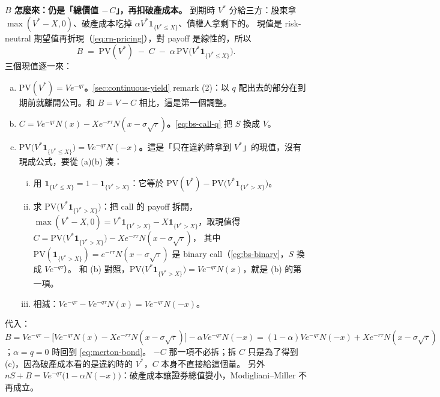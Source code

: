 \begin{remark}[補充]
	\textbf{$B$ 怎麼來：仍是「總價值 $-\,C$」，再扣破產成本。}
	到期時 $V^{*}$ 分給三方：股東拿 $\max(V^{*}-X,0)$、破產成本吃掉 $\alpha V^{*}\mathbf{1}_{\{V^{*}\le X\}}$、債權人拿剩下的。
	現值是 risk-neutral 期望值再折現（\eqref{eq:rn-pricing}），對 payoff 是線性的，所以
	\[
		B \;=\; \mathrm{PV}(V^{*}) \;-\; C \;-\; \alpha\,\mathrm{PV}\bigl(V^{*}\mathbf{1}_{\{V^{*}\le X\}}\bigr) .
	\]
	三個現值逐一來：
	\begin{enumerate}[(a),nosep]
		\item \textbf{$\mathrm{PV}(V^{*})=Ve^{-q\tau}$。}\autoref{sec:continuous-yield} remark (2)：以 $q$ 配出去的部分在到期前就離開公司。和 $B=V-C$ 相比，這是第一個調整。
		\item \textbf{$C=Ve^{-q\tau}N(x)-Xe^{-r\tau}N(x-\sigma\sqrt{\tau})$。}\eqref{eq:bs-call-q} 把 $S$ 換成 $V$。
		\item \textbf{$\mathrm{PV}\bigl(V^{*}\mathbf{1}_{\{V^{*}\le X\}}\bigr)=Ve^{-q\tau}N(-x)$。}這是「只在違約時拿到 $V^{*}$」的現值，沒有現成公式，要從 (a)(b) 湊：
		      \begin{enumerate}[(i),nosep]
			      \item 用 $\mathbf{1}_{\{V^{*}\le X\}}=1-\mathbf{1}_{\{V^{*}>X\}}$：它等於 $\mathrm{PV}(V^{*})-\mathrm{PV}\bigl(V^{*}\mathbf{1}_{\{V^{*}>X\}}\bigr)$。
			      \item 求 $\mathrm{PV}\bigl(V^{*}\mathbf{1}_{\{V^{*}>X\}}\bigr)$：把 call 的 payoff 拆開，$\max(V^{*}-X,0)=V^{*}\mathbf{1}_{\{V^{*}>X\}}-X\mathbf{1}_{\{V^{*}>X\}}$，取現值得
			            $C=\mathrm{PV}\bigl(V^{*}\mathbf{1}_{\{V^{*}>X\}}\bigr)-Xe^{-r\tau}N(x-\sigma\sqrt{\tau})$，
			            其中 $\mathrm{PV}(\mathbf{1}_{\{V^{*}>X\}})=e^{-r\tau}N(x-\sigma\sqrt{\tau})$ 是 binary call（\autoref{eg:bs-binary}，$S$ 換成 $Ve^{-q\tau}$）。
			            和 (b) 對照，$\mathrm{PV}\bigl(V^{*}\mathbf{1}_{\{V^{*}>X\}}\bigr)=Ve^{-q\tau}N(x)$，就是 (b) 的第一項。
			      \item 相減：$Ve^{-q\tau}-Ve^{-q\tau}N(x)=Ve^{-q\tau}N(-x)$。
		      \end{enumerate}
	\end{enumerate}
	代入：$B=Ve^{-q\tau}-\bigl[Ve^{-q\tau}N(x)-Xe^{-r\tau}N(x-\sigma\sqrt{\tau})\bigr]-\alpha Ve^{-q\tau}N(-x)=(1-\alpha)Ve^{-q\tau}N(-x)+Xe^{-r\tau}N(x-\sigma\sqrt{\tau})$；$\alpha=q=0$ 時回到 \eqref{eq:merton-bond}。
	$-C$ 那一項不必拆；拆 $C$ 只是為了得到 (c)，因為破產成本看的是違約時的 $V^{*}$，$C$ 本身不直接給這個量。
	另外 $nS+B=Ve^{-q\tau}\bigl(1-\alpha N(-x)\bigr)$：破產成本讓證券總值變小，Modigliani--Miller 不再成立。
\end{remark}

